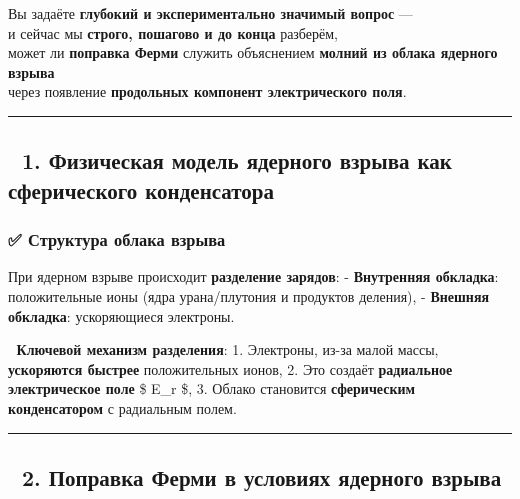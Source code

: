\documentclass[11pt]{article}
\begin{document}
Вы задаёте \textbf{глубокий и экспериментально значимый вопрос} ---\\
и сейчас мы \textbf{строго, пошагово и до конца} разберём,\\
может ли \textbf{поправка Ферми} служить объяснением \textbf{молний из
облака ядерного взрыва}\\
через появление \textbf{продольных компонент электрического поля}.

\begin{center}\rule{0.5\linewidth}{\linethickness}\end{center}

\subsection{🔹 1. Физическая модель ядерного взрыва как сферического
конденсатора}\label{ux444ux438ux437ux438ux447ux435ux441ux43aux430ux44f-ux43cux43eux434ux435ux43bux44c-ux44fux434ux435ux440ux43dux43eux433ux43e-ux432ux437ux440ux44bux432ux430-ux43aux430ux43a-ux441ux444ux435ux440ux438ux447ux435ux441ux43aux43eux433ux43e-ux43aux43eux43dux434ux435ux43dux441ux430ux442ux43eux440ux430}

\subsubsection{✅ Структура облака
взрыва}\label{ux441ux442ux440ux443ux43aux442ux443ux440ux430-ux43eux431ux43bux430ux43aux430-ux432ux437ux440ux44bux432ux430}

При ядерном взрыве происходит \textbf{разделение зарядов}: -
\textbf{Внутренняя обкладка}: положительные ионы (ядра урана/плутония и
продуктов деления), - \textbf{Внешняя обкладка}: ускоряющиеся электроны.

📌 \textbf{Ключевой механизм разделения}: 1. Электроны, из-за малой
массы, \textbf{ускоряются быстрее} положительных ионов, 2. Это создаёт
\textbf{радиальное электрическое поле} \$ E\_r \$, 3. Облако становится
\textbf{сферическим конденсатором} с радиальным полем.

\begin{center}\rule{0.5\linewidth}{\linethickness}\end{center}

\subsection{🔹 2. Поправка Ферми в условиях ядерного
взрыва}\label{ux43fux43eux43fux440ux430ux432ux43aux430-ux444ux435ux440ux43cux438-ux432-ux443ux441ux43bux43eux432ux438ux44fux445-ux44fux434ux435ux440ux43dux43eux433ux43e-ux432ux437ux440ux44bux432ux430}
\end{document}
